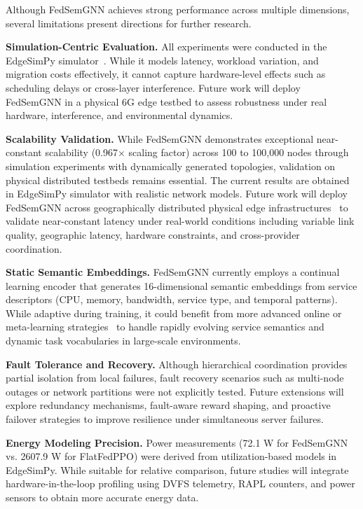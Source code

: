 \documentclass[conference]{IEEEtran}
\begin{document}
	Although FedSemGNN achieves strong performance across multiple dimensions, several limitations present directions for further research.
	
	\textbf{Simulation-Centric Evaluation.}
	All experiments were conducted in the EdgeSimPy simulator~\cite{Souza2023_EdgeSimPy}. While it models latency, workload variation, and migration costs effectively, it cannot capture hardware-level effects such as scheduling delays or cross-layer interference. Future work will deploy FedSemGNN in a physical 6G edge testbed to assess robustness under real hardware, interference, and environmental dynamics.
	
	\textbf{Scalability Validation.}
	While FedSemGNN demonstrates exceptional near-constant scalability (0.967$\times$ scaling factor) across 100 to 100,000 nodes through simulation experiments with dynamically generated topologies, validation on physical distributed testbeds remains essential. The current results are obtained in EdgeSimPy simulator with realistic network models. Future work will deploy FedSemGNN across geographically distributed physical edge infrastructures~\cite{Zhou2023_MARLFed, Bonawitz2019TowardsFL} to validate near-constant latency under real-world conditions including variable link quality, geographic latency, hardware constraints, and cross-provider coordination.
	
	\textbf{Static Semantic Embeddings.}
	FedSemGNN currently employs a continual learning encoder that generates 16-dimensional semantic embeddings from service descriptors (CPU, memory, bandwidth, service type, and temporal patterns). While adaptive during training, it could benefit from more advanced online or meta-learning strategies~\cite{Hu2023_PersonalizedFL} to handle rapidly evolving service semantics and dynamic task vocabularies in large-scale environments.
	
	\textbf{Fault Tolerance and Recovery.}
	Although hierarchical coordination provides partial isolation from local failures, fault recovery scenarios such as multi-node outages or network partitions were not explicitly tested. Future extensions will explore redundancy mechanisms, fault-aware reward shaping, and proactive failover strategies to improve resilience under simultaneous server failures.
	
	\textbf{Energy Modeling Precision.}
	Power measurements (72.1 W for FedSemGNN vs. 2607.9 W for FlatFedPPO) were derived from utilization-based models in EdgeSimPy. While suitable for relative comparison, future studies will integrate hardware-in-the-loop profiling using DVFS telemetry, RAPL counters, and power sensors to obtain more accurate energy data.
	
\end{document}
